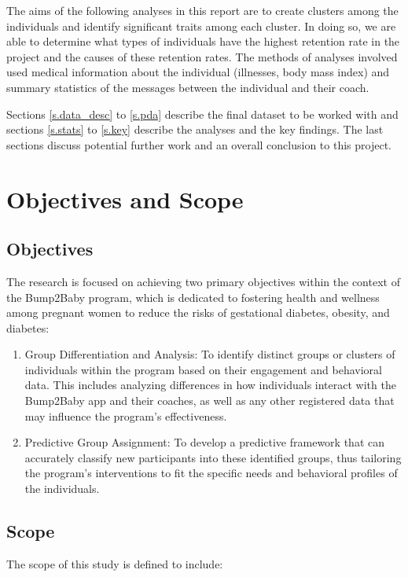 \documentclass[12pt]{article}
\begin{document}
		The aims of the following analyses in this report are to create clusters among the individuals and identify significant traits among each cluster. In doing so, we are able to determine what types of individuals have the highest retention rate in the project and the causes of these retention rates. The methods of analyses involved used medical information about the individual (illnesses, body mass index) and summary statistics of the messages between the individual and their coach.
		
		Sections \ref{s.data_desc} to \ref{s.pda} describe the final dataset to be worked with and sections \ref{s.stats} to \ref{s.key} describe the analyses and the key findings. The last sections discuss potential further work and an overall conclusion to this project.

\section{Objectives and Scope}

\label{s.obj&s}

\subsection{Objectives}
The research is focused on achieving two primary objectives within the context of the Bump2Baby program, which is dedicated to fostering health and wellness among pregnant women to reduce the risks of gestational diabetes, obesity, and diabetes:

\begin{enumerate}
\item Group Differentiation and Analysis: To identify distinct groups or clusters of individuals within the program based on their engagement and behavioral data. This includes analyzing differences in how individuals interact with the Bump2Baby app and their coaches, as well as any other registered data that may influence the program's effectiveness.

\item Predictive Group Assignment: To develop a predictive framework that can accurately classify new participants into these identified groups, thus tailoring the program's interventions to fit the specific needs and behavioral profiles of the individuals.
\end{enumerate}

\subsection{Scope}
The scope of this study is defined to include:
\end{document}

